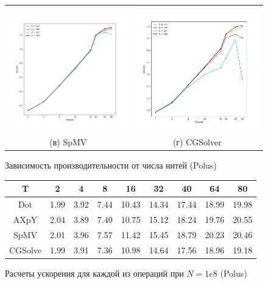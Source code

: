 \documentclass[12pt, a4paper]{article}
\begin{document}
\begin{figure}[H]
\begin{tabular}{cc}
		\includegraphics[width=85mm]{multithread_polus_spmv} & \includegraphics[width=85mm]{multithread_polus_cgsolver} \\
		(в) SpMV & (г) CGSolver \\[6pt]
	\end{tabular}
	\caption{Зависимость производительности от числа нитей (Polus)}
	\label{fig:multithread_flops_polus} 
\end{figure}

\begin{figure}[H]
	\center
	\setlength{\tabcolsep}{10pt}
	\renewcommand{\arraystretch}{1.5}
	\begin{tabular}{|c|c|c|c|c|c|c|c|c|}
		\hline
		T & 2 & 4 & 8 & 16 & 32 & 40 & 64 & 80  \\
		\hline
		Dot & 1.99 & 3.92 & 7.44 & 10.43 & 14.34 & 17.44 & 18.99 & 19.98 \\
		\hline
		AXpY & 2.04 & 3.89 & 7.40 & 10.75 & 15.12 & 18.24 & 19.76 & 20.55  \\
		\hline
		SpMV & 2.01 & 3.96 & 7.57 & 11.42 & 15.45 & 18.79 & 20.23 & 20.46  \\
		\hline
		CGSolve & 1.99 & 3.91 & 7.36 & 10.98 & 14.64 & 17.56 & 18.96 & 19.18 \\
		\hline
	\end{tabular}
	\caption{Расчеты ускорения для каждой из операций при $N = 1e8$ (Polus)}
	\label{fig:speedup}
\end{figure}
\end{document}

